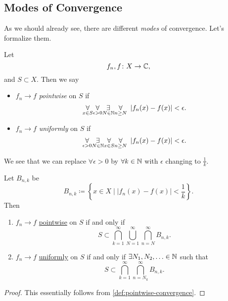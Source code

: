 \subsection{Modes of Convergence}
As we should already see, there are different \emph{modes} of convergence. Let's formalize them.
\begin{definition}\label{def:pointwise-convergence}\label{def:uniformly-convergence}
	Let
	\[
		f_{n}, f\colon X\to \mathbb{\MakeUppercase{c}},
	\]
	and \(S\subset X\). Then we say
	\begin{itemize}
		\item \(f_{n}\to f\) \emph{pointwise} on \(S\) if
		      \[
			      \underset{x\in S}{\forall}\underset{\epsilon>0}{\forall} \underset{ N\in \mathbb{\MakeUppercase{N}}}{\exists}\underset{n\geq  N}{\forall}\ \left\vert f_{n}(x) - f(x) \right\vert < \epsilon.
		      \]
		\item \(f_{n}\to f\) \emph{uniformly} on \(S\) if
		      \[
			      \underset{\epsilon >0}{\forall}\underset{N\in\mathbb{\MakeUppercase{n}}}{\exists}\underset{x\in S}{\forall}\underset{n\geq N}{\forall}\ \left\vert f_{n}(x) - f(x) \right\vert < \epsilon.
		      \]
	\end{itemize}
\end{definition}

\begin{remark}
	We see that we can replace \(\forall \epsilon > 0\) by \(\forall k\in \mathbb{\MakeUppercase{n}} \) with \(\epsilon \) changing to \(\frac{1}{k}\).
\end{remark}
\begin{lemma}
	Let \(B_{n, k}\) be
	\[
		B_{n, k}\coloneqq \left\{x\in X \mid \left\vert f_{n}(x) - f(x) \right\vert < \frac{1}{k}\right\}.
	\]
	Then
	\begin{enumerate}
		\item \(f_{n}\to f\) \hyperref[def:pointwise-convergence]{pointwise} on \(S\) if and only if
		      \[
			      S\subset \bigcap\limits_{k=1}^{\infty} \bigcup\limits_{N=1}^{\infty} \bigcap\limits_{n=N}^{\infty} B_{n, k}.
		      \]
		\item \(f_{n}\to f\) \hyperref[def:uniformly-convergence]{uniformly} on \(S\) if and only if \(\exists N_1, N_2, \ldots \in \mathbb{\MakeUppercase{n}}\) such that
		      \[
			      S\subset \bigcap\limits_{k=1}^{\infty} \bigcap\limits_{n=N_{k}}^{\infty} B_{n, k}.
		      \]
	\end{enumerate}
\end{lemma}
\begin{proof}
	This essentially follows from \autoref{def:pointwise-convergence}.
\end{proof}

